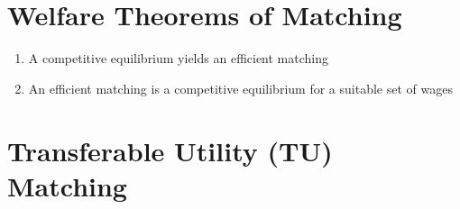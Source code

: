 \documentclass{article}
\begin{document}

\section*{Welfare Theorems of Matching}

\begin{enumerate}
	\item A competitive equilibrium yields an efficient matching
	
	\item An efficient matching is a competitive equilibrium for a suitable set of wages
\end{enumerate}





\section*{Transferable Utility (TU) Matching}
\end{document}
